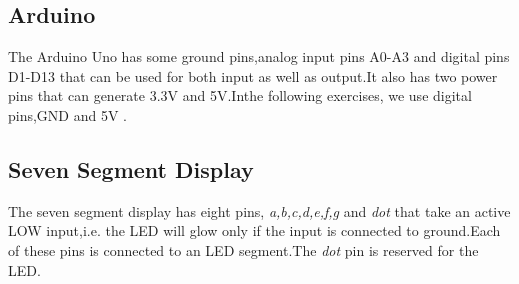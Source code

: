 \documentclass[journal,twocolumn,10pt, a4paper]{article}
\begin{document}
\subsection{Arduino} 
The Arduino Uno has some ground pins,analog input pins A0-A3 and digital pins D1-D13 that can be used for both input as well as output.It also has two power pins that can generate 3.3V and 5V.Inthe following exercises, we use digital pins,GND and 5V .
\subsection{Seven Segment Display}
The seven segment display has eight pins, \emph{a,b,c,d,e,f,g} and \emph{dot} that take an active LOW input,i.e. the LED will glow only if the input is connected to ground.Each of these pins is connected to an LED segment.The \emph{dot} pin is reserved for the LED.
\end{document}
